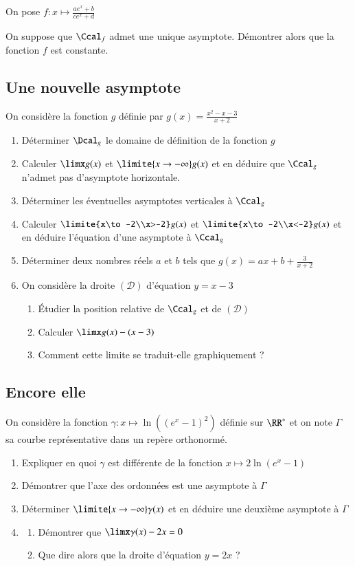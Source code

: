 \documentclass[oneside,12pt]{article}          %
\begin{document}
On pose $f:x\mapsto \frac{ae^x+b}{ce^x+d}$

On suppose que $\Ccal_f$ admet une unique asymptote. Démontrer alors que la fonction $f$ est constante.



\subsection{Une nouvelle asymptote}
On considère la fonction $g$ définie par $g(x)=\frac{x^2-x-3}{x+2}$
\begin{enumerate}
    \item Déterminer $\Dcal_g$ le domaine de définition de la fonction $g$
    \item Calculer $\limx g(x)$ et $\limite{x\to-\infty}g(x)$ et en déduire que $\Ccal_g$ n'admet pas d'asymptote horizontale.
    \item Déterminer les éventuelles asymptotes verticales à $\Ccal_g$
    \item Calculer $\limite{x\to-2\\x>-2}g(x)$ et $\limite{x\to-2\\x<-2}g(x)$ et en déduire l'équation d'une asymptote à $\Ccal_g$
    \item Déterminer deux nombres réels $a$ et $b$ tels que $g(x)=ax+b+\frac{3}{x+2}$
    \item On considère la droite $(\mathcal{D})$ d'équation $y=x-3$
    \begin{enumerate}
        \item Étudier la position relative de $\Ccal_g$ et de $(\mathcal{D})$
        \item Calculer $\limx g(x)-(x-3)$
        \item Comment cette limite se traduit-elle graphiquement ?
	\end{enumerate}
\end{enumerate}



\subsection{Encore elle}
On considère la fonction $\gamma:x\mapsto\ln\left((e^x-1)^2\right)$ définie sur $\RR^*$ et on note $\Gamma$ sa courbe représentative dans un repère orthonormé.
\begin{enumerate}
	\item Expliquer en quoi $\gamma$ est différente de la fonction $x\mapsto2\ln(e^x-1)$
	\item Démontrer que l'axe des ordonnées est une asymptote à $\Gamma$
	\item Déterminer $\limite{x\to-\infty} \gamma(x)$ et en déduire une deuxième asymptote à $\Gamma$
	\item \begin{enumerate}
		\item Démontrer que $\limx \gamma(x)-2x=0$
		\item Que dire alors que la droite d'équation $y=2x$ ?
	\end{enumerate}
\end{enumerate}
\end{document}
